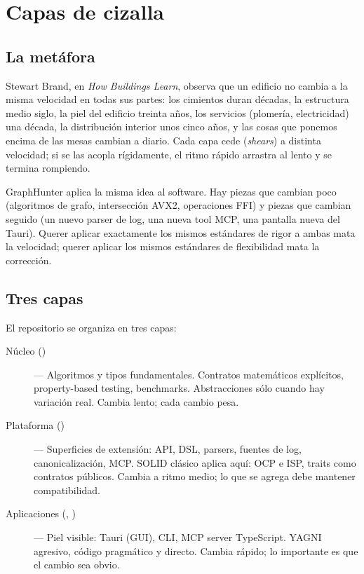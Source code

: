 \chapter{Capas de cizalla}
\label{sec:shearing-layers}

\section{La metáfora}

Stewart Brand, en \emph{How Buildings Learn}, observa que un edificio
no cambia a la misma velocidad en todas sus partes: los cimientos
duran décadas, la estructura medio siglo, la piel del edificio
treinta años, los servicios (plomería, electricidad) una década,
la distribución interior unos cinco años, y las cosas que ponemos
encima de las mesas cambian a diario. Cada capa cede (\emph{shears})
a distinta velocidad; si se las acopla rígidamente, el ritmo rápido
arrastra al lento y se termina rompiendo.

GraphHunter aplica la misma idea al software. Hay piezas que
cambian poco (algoritmos de grafo, intersección AVX2, operaciones
FFI) y piezas que cambian seguido (un nuevo parser de log, una
nueva tool MCP, una pantalla nueva del Tauri). Querer aplicar
exactamente los mismos estándares de rigor a ambas mata la
velocidad; querer aplicar los mismos estándares de flexibilidad
mata la corrección.

\section{Tres capas}

El repositorio se organiza en tres capas:

\begin{description}
    \item[Núcleo ()] — Algoritmos y tipos
    fundamentales. Contratos matemáticos explícitos, property-based
    testing, benchmarks. Abstracciones sólo cuando hay variación
    real. Cambia lento; cada cambio pesa.
    \item[Plataforma ()] — Superficies de
    extensión: API, DSL, parsers, fuentes de log, canonicalización,
    MCP. SOLID clásico aplica aquí: OCP e ISP, traits como contratos
    públicos. Cambia a ritmo medio; lo que se agrega debe mantener
    compatibilidad.
    \item[Aplicaciones (, )]
    — Piel visible: Tauri (GUI), CLI, MCP server TypeScript. YAGNI
    agresivo, código pragmático y directo. Cambia rápido; lo
    importante es que el cambio sea obvio.
\end{description}

